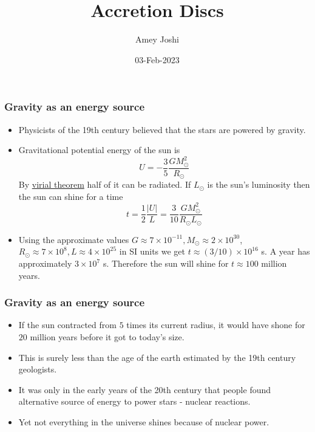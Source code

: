 \documentclass{beamer}
\title{Accretion Discs}
\author{Amey Joshi}
\date{03-Feb-2023}
\begin{document}
\frame{\titlepage}

\begin{frame}
\frametitle{Gravity as an energy source}
\begin{itemize}
\item Physicists of the 19th century believed that the stars are powered by gravity.
\item Gravitational potential energy of the sun is
\begin{equation}\label{e1}
U = -\frac{3}{5}\frac{GM_\odot^2}{R_\odot}
\end{equation}
By \href{https://en.wikipedia.org/wiki/Virial_theorem}{virial theorem} half of it can be radiated. If $L_\odot$ is the sun's 
luminosity then the sun can shine for a time
\begin{equation}\label{e2}
t = \frac{1}{2}\frac{|U|}{L} = \frac{3}{10}\frac{GM_\odot^2}{R_\odot L_\odot}
\end{equation}
\item Using the approximate values $G \approx 7 \times 10^{-11}, M_\odot \approx 2 \times 10^{30}$, $R_\odot \approx 7 \times
10^{8}, L \approx 4 \times 10^{25}$ in SI units we get $t \approx (3/10) \times 10^{16}$ s. A year has approximately $3 \times
10^7$ s. Therefore the sun will shine for $t \approx 100$ million years.
\end{itemize}
\end{frame}

\begin{frame}
\frametitle{Gravity as an energy source}
\begin{itemize}
\item If the sun contracted from $5$ times its current radius, it would have shone for $20$ million years before it got to
today's size.
\item This is surely less than the age of the earth estimated by the 19th century geologists.
\item It was only in the early years of the 20th century that people found alternative source of energy to power stars - nuclear 
reactions.
\item Yet not everything in the universe shines because of nuclear power.
\end{itemize}
\end{frame}
\end{document}
